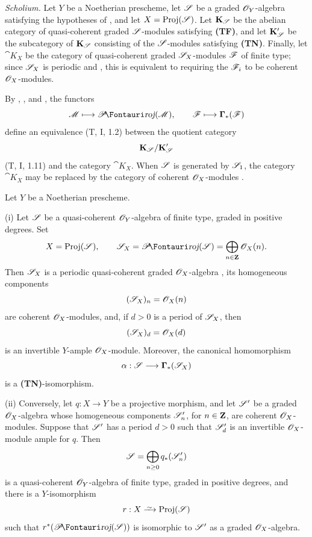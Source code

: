 \begin{env}[2.3.3]
\label{III.2.3.3}
\emph{Scholium.}
Let $Y$ be a Noetherian prescheme, let $\mathscr{S}$ be a graded $\mathscr{O}_Y$-algebra satisfying the hypotheses of , and let $X=\operatorname{Proj}(\mathscr{S})$.
Let $\mathbf{K}_{\mathscr{S}}$ be the abelian category of quasi-coherent graded $\mathscr{S}$-modules satisfying \textbf{(TF)}, and let $\mathbf{K}'_{\mathscr{S}}$ be the subcategory of $\mathbf{K}_{\mathscr{S}}$ consisting of the $\mathscr{S}$-modules satisfying \textbf{(TN)}.
Finally, let $\cat{K}_X$ be the category of quasi-coherent graded $\mathscr{S}_X$-modules $\mathscr{F}$ of finite type; since $\mathscr{S}_X$ is periodic  and , this is equivalent to requiring the $\mathscr{F}_i$ to be coherent $\mathscr{O}_X$-modules.

By , , and , the functors
\[
  \sh{M}\longmapsto\shProj(\sh{M}),
  \qquad
  \sh{F}\longmapsto\bbGamma_*(\sh{F})
\]
define an equivalence (T, I, 1.2) between the quotient category
\[
  \mathbf{K}_{\mathscr{S}}/\mathbf{K}'_{\mathscr{S}}
\]
(T, I, 1.11) and the category $\cat{K}_X$.
When $\mathscr{S}$ is generated by $\mathscr{S}_1$, the category $\cat{K}_X$ may be replaced by the category of coherent $\mathscr{O}_X$-modules .
\end{env}

\begin{proposition}[2.3.4]
\label{III.2.3.4}
Let $Y$ be a Noetherian prescheme.

(i) Let $\mathscr{S}$ be a quasi-coherent $\mathscr{O}_Y$-algebra of finite type, graded in positive degrees.
Set
\[
  X=\Proj(\sh{S}),\qquad
  \sh{S}_X=\shProj(\sh{S})
  =\bigoplus_{n\in\bb{Z}}\sh{O}_X(n).
\]
Then $\mathscr{S}_X$ is a periodic quasi-coherent graded $\mathscr{O}_X$-algebra , its homogeneous components
\[
  (\mathscr{S}_X)_n=\mathscr{O}_X(n)
\]
are coherent $\mathscr{O}_X$-modules, and, if $d>0$ is a period of $\mathscr{S}_X$, then
\[
  (\mathscr{S}_X)_d=\mathscr{O}_X(d)
\]
is an invertible $Y$-ample $\mathscr{O}_X$-module.
Moreover, the canonical homomorphism
\[
  \alpha:\mathscr{S}\longrightarrow\boldsymbol{\Gamma}_*(\mathscr{S}_X)
\]
is a \textbf{(TN)}-isomorphism.

(ii) Conversely, let $q:X\to Y$ be a projective morphism, and let $\mathscr{S}'$ be a graded $\mathscr{O}_X$-algebra whose homogeneous components $\mathscr{S}'_n$, for $n\in\mathbf{Z}$, are coherent $\mathscr{O}_X$-modules.
Suppose that $\mathscr{S}'$ has a period $d>0$ such that $\mathscr{S}'_d$ is an invertible $\mathscr{O}_X$-module ample for $q$.
Then
\[
  \mathscr{S}=\bigoplus_{n\geq0}q_*(\mathscr{S}'_n)
\]
is a quasi-coherent $\mathscr{O}_Y$-algebra of finite type, graded in positive degrees, and there is a $Y$-isomorphism
\[
  r:X\simto\Proj(\sh{S})
\]
such that $r^*(\shProj(\sh{S}))$ is isomorphic to $\mathscr{S}'$ as a graded $\mathscr{O}_X$-algebra.
\end{proposition}

